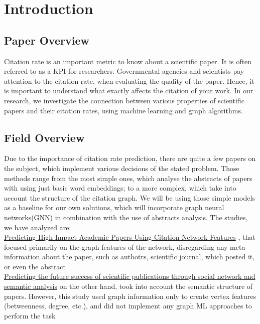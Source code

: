 \tableofcontents

\newpage
\section{Introduction}

\subsection{Paper Overview}

\tab Citation rate is an important metric to know about a scientific paper. It is often referred to as a KPI for researchers. Governmental agencies and scientists pay attention to the citation rate, when evaluating the quality of the paper. Hence, it is important to understand what exactly affects the citation of your work. In our research, we investigate the connection between various properties of scientific papers and their citation rates, using machine learning and graph algorithms. \\

\subsection{Field Overview}
\tab Due to the importance of citation rate prediction, there are quite a few papers on the subject, which implement various decisions of the stated problem. Those methods range from the most simple ones, which analyse the abstracts of papers with using just basic word embeddings; to a more complex, which take into account the structure of the citation graph. We will be using those simple models as a baseline for our own solutions, which will incorporate graph neural networks(GNN) in combination with the use of abstracts analysis. The studies, we have analyzed are: \\

\tab \href{https://link.springer.com/chapter/10.1007/978-3-642-40319-4_2?fromPaywallRec=false}{Predicting High Impact Academic Papers Using Citation Network Features} , that focused primarily on the graph features of the network, disregarding any meta-information about the paper, such as authotrs, scientific journal, which posted it, or even the abstract\\

\tab \href{https://link.springer.com/article/10.1007/s11192-020-03479-5?fromPaywallRec=true}{Predicting the future success of scientific publications through social network and semantic analysis} on the other hand, took into account the semantic structure of papers. However, this study used graph information only to create vertex features (betweenness, degree, etc.), and did not implement any graph ML approaches to perform the task\\

